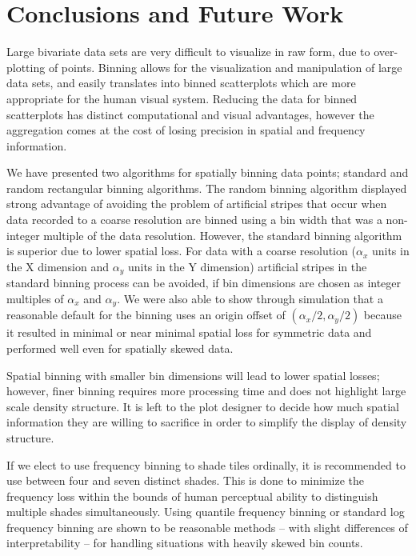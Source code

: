 \documentclass[11pt]{isuthesis}\usepackage[]{graphicx}\usepackage[]{color}
\begin{document}

\section{Conclusions and Future Work}

Large bivariate data sets are very difficult to visualize in raw form, due to over-plotting of points. Binning allows for the visualization and manipulation of large data sets, and easily translates into binned scatterplots which are more appropriate for the human visual system. Reducing the data for binned scatterplots has distinct computational and visual advantages, however the aggregation comes at the cost of losing precision in spatial and frequency information.

We have presented two algorithms for spatially binning data points; standard and random rectangular binning algorithms. The random binning algorithm displayed strong advantage of avoiding the problem of artificial stripes that occur when data recorded to a coarse resolution are binned using a bin width that was a non-integer multiple of the data resolution. However, the standard binning algorithm is superior due to lower spatial loss. For data with a coarse resolution ($\alpha_x$ units in the X dimension and $\alpha_y$ units in the Y dimension) artificial stripes in the standard binning process can be avoided, if  bin dimensions are chosen as integer multiples of $\alpha_x$ and $\alpha_y$.  We were also able to show through simulation that a reasonable default for the binning uses an origin offset of $(\alpha_x/2, \alpha_y/2)$ because it resulted in minimal or near minimal spatial loss for symmetric data and performed well even for spatially skewed data. 

Spatial binning with smaller bin dimensions will lead to lower spatial losses; however, finer binning requires more processing time and does not highlight large scale density structure. It is left to the plot designer to decide how much spatial information they are willing to sacrifice in order to simplify the display of density structure. %

If we elect to use frequency binning to shade tiles ordinally, it is recommended to use between four and seven distinct shades. This is done to minimize the frequency loss within the bounds of human perceptual ability to distinguish multiple shades simultaneously. Using quantile frequency binning or standard log frequency binning are shown to be reasonable methods -- with slight differences of interpretability -- for handling situations with heavily skewed bin counts.
\end{document}
